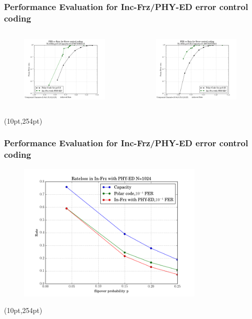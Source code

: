 \documentclass[xcolor=dvipsnames]{beamer}
\newcommand\hyperback[1]{%
  \begin{textblock*}{\paperwidth}(10pt,254pt)
    \raggedright #1\hspace{.5em}
  \end{textblock*}}
\begin{document}
\begin{frame}[label=pch2]
\frametitle{Performance Evaluation for Inc-Frz/PHY-ED error control coding}
\begin{minipage}[1.1\textheight]{\textwidth}
\begin{columns}
\begin{column}{0.5\textwidth}
\begin{figure}
\centering
\includegraphics[width=6cm]{./FER_channel0p2.png}
\end{figure}
\end{column}
\begin{column}{0.5\textwidth}
\begin{figure}
\centering
\includegraphics[width=6cm]{./FER_channel0p25.png}
\end{figure}
\end{column}
\end{columns}
\end{minipage}
\hyperback{\hyperlink{psw2}{}}
\end{frame}

\begin{frame}[label=pch3]
\frametitle{Performance Evaluation for Inc-Frz/PHY-ED error control coding}
\begin{figure}
\centering
\includegraphics[width=9cm]{./rateloss_channel.png}
\end{figure}
\hyperback{\hyperlink{psw3}{}}
\end{frame}
\end{document}
